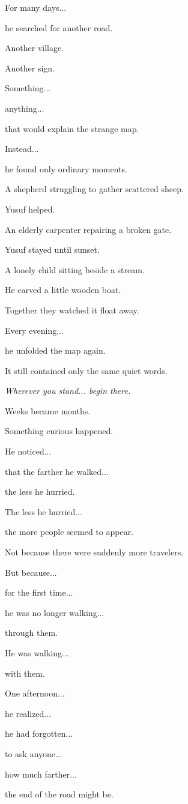 \documentclass[12pt,openany]{book}
\begin{document}
For many days...

he searched for another road.

Another village.

Another sign.

Something...

anything...

that would explain the strange map.

Instead...

he found only ordinary moments.

A shepherd struggling to gather scattered sheep.

Yusuf helped.

An elderly carpenter repairing a broken gate.

Yusuf stayed until sunset.

A lonely child sitting beside a stream.

He carved a little wooden boat.

Together they watched it float away.

Every evening...

he unfolded the map again.

It still contained only the same quiet words.

\emph{Wherever you stand... begin there.}

Weeks became months.

Something curious happened.

He noticed...

that the farther he walked...

the less he hurried.

The less he hurried...

the more people seemed to appear.

Not because there were suddenly more travelers.

But because...

for the first time...

he was no longer walking...

through them.

He was walking...

with them.

One afternoon...

he realized...

he had forgotten...

to ask anyone...

how much farther...

the end of the road might be.
\end{document}

